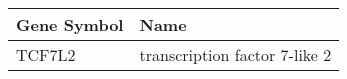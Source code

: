\begin{tabular}{ll}
\toprule
Gene Symbol &                          Name \\
\midrule
     TCF7L2 & transcription factor 7-like 2 \\
\bottomrule
\end{tabular}
